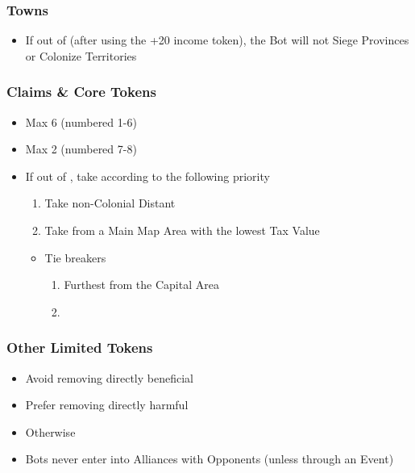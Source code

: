 \documentclass[10pt]{article}
\begin{document}
\subsubsection*{Towns}
\begin{itemize}
	\item If out of \towns (after using the +20 income token), the Bot will not Siege Provinces or Colonize Territories
\end{itemize}

\subsubsection*{Claims \& Core Tokens}
\begin{itemize}
	\item Max 6 \claims (numbered 1-6)
	\item Max 2 \cores (numbered 7-8)
	\item If out of \claims, take according to the following priority
	\begin{enumerate}
		\item Take non-Colonial Distant \claims
		\item Take \claims from a Main Map Area with the lowest Tax Value
	\end{enumerate}
	\begin{itemize}
		\item Tie breakers
		\begin{enumerate}
			\item Furthest from the Capital Area
			\item \az
		\end{enumerate}
	\end{itemize}
\end{itemize}

\subsubsection*{Other Limited Tokens}
\begin{itemize}
	\item Avoid removing directly beneficial
	\item Prefer removing directly harmful
	\item Otherwise \az
\end{itemize}

\begin{itemize}
	\item Bots never enter into Alliances with Opponents (unless through an Event)
\end{itemize}
\end{document}
